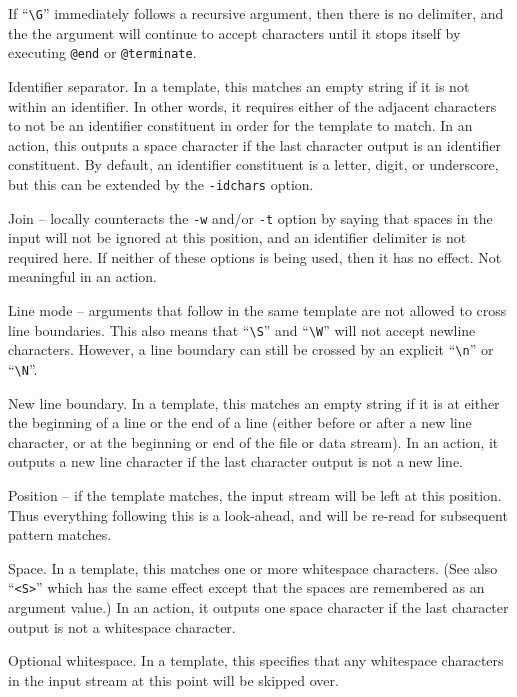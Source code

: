 \begin{description}
If ``\verb/\G/'' immediately follows a recursive argument, then there is no
delimiter, and the the argument will continue to accept characters until it
stops itself by executing \verb/@end/ or \verb/@terminate/.
\item[{\tt $\backslash$I}]
Identifier separator.  In a template, this matches an empty string if it
is not within an identifier.  In other words, it requires either of the
adjacent characters to not be an identifier constituent in order for the
template to match.
In an action, this outputs a space character if the last character
output is an identifier constituent.
By default, an identifier constituent is a letter, digit, or underscore,
but this can be extended by the \verb/-idchars/ option.
\item[{\tt $\backslash$J}]
Join -- locally counteracts the \verb/-w/ and/or \verb/-t/
option by saying that spaces in the input will not be ignored at this
position, and an identifier delimiter is not required here.
If neither of these options is being used, then it has no effect.
Not meaningful in an action.
\item[{\tt $\backslash$L}]
Line mode -- arguments that follow in the same template are not allowed
to cross line boundaries.
This also means that ``\verb/\S/'' and ``\verb/\W/'' will not accept
newline characters.  However, a line boundary can still be crossed by an
explicit ``\verb/\n/'' or ``\verb/\N/''.
\item[{\tt $\backslash$N}]
New line boundary.
In a template, this matches an empty string if it is at either the
beginning of a line or the end of a line (either before or after a new
line character, or at the beginning or end of the file or data stream).
In an action, it outputs a new line character if the last character
output is not a new line.
\item[{\tt $\backslash$P}]
Position -- if the template matches, the input stream will be left at
this position.  Thus everything following this is a look-ahead, and will
be re-read for subsequent pattern matches.
\item[{\tt $\backslash$S}]
Space.  In a template, this matches one or more whitespace characters.
(See also ``\verb/<S>/'' which has the same effect except that the
spaces are remembered as an argument value.)
In an action, it outputs one space character if the last character
output is not a whitespace character.
\item[{\tt $\backslash$W}]
Optional whitespace.  In a template, this specifies that any whitespace
characters in the input stream at this point will be skipped over.

\end{description}
